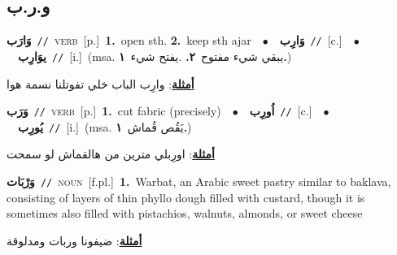 \documentclass[10pt,a4paper,twoside]{article} %
\begin{document}
\begin{multicols}{2}
\vspace{-3mm}
\subsection*{\color{blue}\foreignlanguage{arabic}{و.ر.ب}\color{blue}{}} 

{\setlength\topsep{0pt}\textbf{\foreignlanguage{arabic}{وَارَب}}\ {\color{gray}\texttt{//}\color{black}}\ \textsc{verb}\ [p.]\ \textbf{1.}~open sth.  \textbf{2.}~keep sth ajar\ \ $\bullet$\ \ \setlength\topsep{0pt}\textbf{\foreignlanguage{arabic}{وَارِب}}\ {\color{gray}\texttt{//}\color{black}}\ [c.]\ \ $\bullet$\ \ \setlength\topsep{0pt}\textbf{\foreignlanguage{arabic}{يوَارِب}}\ {\color{gray}\texttt{//}\color{black}}\ [i.]\ \color{gray}(msa. \foreignlanguage{arabic}{يبقي شيء مفتوح}~\foreignlanguage{arabic}{\textbf{٢.}}  .\foreignlanguage{arabic}{يفتح شيء}~\foreignlanguage{arabic}{\textbf{١.}})\color{black}\  \begin{flushright}\color{gray}\foreignlanguage{arabic}{\textbf{\underline{\foreignlanguage{arabic}{أمثلة}}}: وارِب الباب خلي تفوتلنا نسمة هوا}\end{flushright}\color{black}} \vspace{2mm}

{\setlength\topsep{0pt}\textbf{\foreignlanguage{arabic}{وَرَب}}\ {\color{gray}\texttt{//}\color{black}}\ \textsc{verb}\ [p.]\ \textbf{1.}~cut fabric (precisely)\ \ $\bullet$\ \ \setlength\topsep{0pt}\textbf{\foreignlanguage{arabic}{اُورِب}}\ {\color{gray}\texttt{//}\color{black}}\ [c.]\ \ $\bullet$\ \ \setlength\topsep{0pt}\textbf{\foreignlanguage{arabic}{يُورِب}}\ {\color{gray}\texttt{//}\color{black}}\ [i.]\ \color{gray}(msa. \foreignlanguage{arabic}{يَقُص قُماش}~\foreignlanguage{arabic}{\textbf{١.}})\color{black}\  \begin{flushright}\color{gray}\foreignlanguage{arabic}{\textbf{\underline{\foreignlanguage{arabic}{أمثلة}}}: اورِبلي مترين من هالقماش لو سمحت}\end{flushright}\color{black}} \vspace{2mm}

{\setlength\topsep{0pt}\textbf{\foreignlanguage{arabic}{وَرْبَات}}\ {\color{gray}\texttt{//}\color{black}}\ \textsc{noun}\ [f.pl.]\ \textbf{1.}~Warbat, an Arabic sweet pastry similar to baklava, consisting of layers of thin phyllo dough filled with custard, though it is sometimes also filled with pistachios, walnuts, almonds, or sweet cheese\  \begin{flushright}\color{gray}\foreignlanguage{arabic}{\textbf{\underline{\foreignlanguage{arabic}{أمثلة}}}: ضيفونا وربات ومدلوقة}\end{flushright}\color{black}} \vspace{2mm}


\end{multicols}
\end{document}
